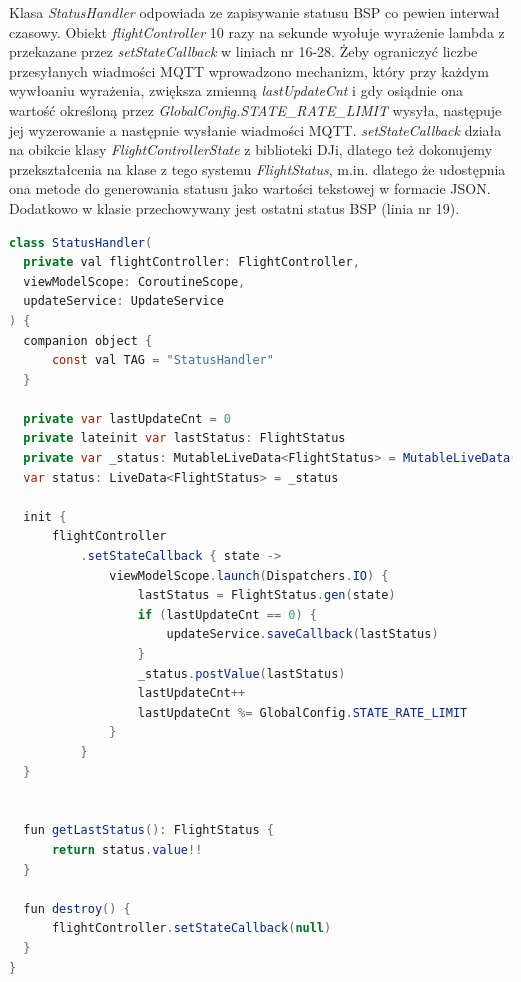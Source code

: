 Klasa \textit{StatusHandler} odpowiada ze zapisywanie statusu BSP co pewien interwał czasowy. Obiekt \textit{flightController} 10 razy na sekunde wyołuje wyrażenie lambda z przekazane przez \textit{setStateCallback} w liniach nr 16-28. Żeby ograniczyć liczbe przesyłanych wiadmości MQTT wprowadzono mechanizm, który przy każdym wywłoaniu wyrażenia, zwiększa zmienną \textit{lastUpdateCnt} i gdy osiądnie ona wartość określoną przez \textit{GlobalConfig.STATE\_RATE\_LIMIT} wysyła, następuje jej wyzerowanie a następnie wysłanie wiadmości MQTT. \textit{setStateCallback} działa na obikcie klasy \textit{FlightControllerState} z biblioteki DJi, dlatego też dokonujemy przekształcenia na  klase z tego systemu \textit{FlightStatus}, m.in. dlatego że udostępnia ona metode do generowania statusu jako wartości tekstowej w formacie JSON. Dodatkowo w klasie przechowywany jest ostatni status BSP (linia nr 19).

\begin{lstlisting}[language=Java, caption=Klasa \textit{StatusHandler}]
class StatusHandler(
  private val flightController: FlightController,
  viewModelScope: CoroutineScope,
  updateService: UpdateService
) {
  companion object {
      const val TAG = "StatusHandler"
  }

  private var lastUpdateCnt = 0
  private lateinit var lastStatus: FlightStatus
  private var _status: MutableLiveData<FlightStatus> = MutableLiveData()
  var status: LiveData<FlightStatus> = _status

  init {
      flightController
          .setStateCallback { state ->
              viewModelScope.launch(Dispatchers.IO) {
                  lastStatus = FlightStatus.gen(state)
                  if (lastUpdateCnt == 0) {
                      updateService.saveCallback(lastStatus)
                  }
                  _status.postValue(lastStatus)
                  lastUpdateCnt++
                  lastUpdateCnt %= GlobalConfig.STATE_RATE_LIMIT
              }
          }
  }


  fun getLastStatus(): FlightStatus {
      return status.value!!
  }

  fun destroy() {
      flightController.setStateCallback(null)
  }
}
\end{lstlisting}

